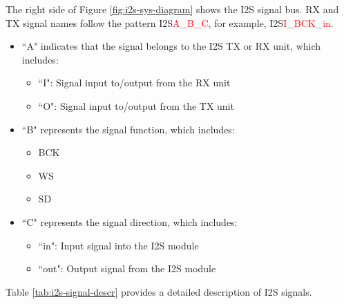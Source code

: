 \documentclass[main\_\_EN.tex]{subfiles}
\begin{document}
The right side of Figure \ref{fig:i2s-sys-diagram} shows the I2S signal bus. RX and TX signal names follow the pattern I2S\textcolor{red}{A}\_\textcolor{red}{B}\_\textcolor{red}{C}, for example, I2S\textcolor{red}{I}\_\textcolor{red}{BCK}\_\textcolor{red}{in}.

\begin{itemize}
    \item ``A" indicates that the signal belongs to the I2S TX or RX unit, which includes:
    \begin{itemize}
        \item ``I": Signal input to/output from the RX unit
        \item ``O": Signal input to/output from the TX unit
    \end{itemize}
    \item ``B" represents the signal function, which includes:
    \begin{itemize}
        \item BCK
        \item WS
        \item SD
    \end{itemize}
    \item ``C" represents the signal direction, which includes:
    \begin{itemize}
        \item ``in": Input signal into the I2S module
        \item ``out": Output signal from the I2S module
    \end{itemize}
\end{itemize}

Table \ref{tab:i2s-signal-descr} provides a detailed description of I2S signals.
\end{document}
